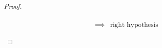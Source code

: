 \begin{proof}
\begin{enumerate}
\begin{enumerate}
\begin{enumerate}
\begin{align*}
                \\\implies& \text{right hypothesis}
              \end{align*}

\end{enumerate}
\end{enumerate}
\end{enumerate}
\end{proof}
